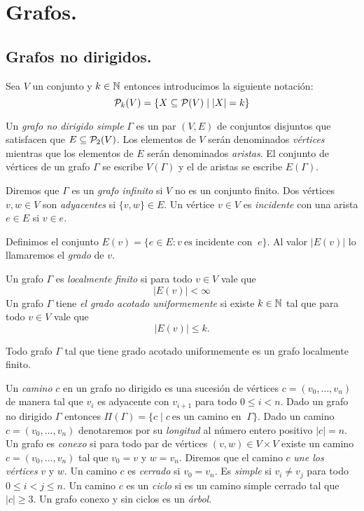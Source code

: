 \documentclass[tesis.tex]{subfiles}
\begin{document}
\section{Grafos.}

\subsection{Grafos no dirigidos.}\label{secc_graf_nd}

Sea $V$ un conjunto y $k \in \mathbb{N}$ entonces introducimos la siguiente notación:
\[
	{\cal P}_k(V) = \{ X \subseteq {\cal P}(V) \mid |X| = k   \}
\]

\begin{deff}
	Un \emph{grafo no dirigido simple} $\Gamma$ es un par $(V,E)$ de conjuntos disjuntos que satisfacen que
	$E \subseteq {\cal P}_{2}(V)$.
	Los elementos de $V$ serán denominados \emph{vértices} mientras que los elementos de $E$ serán denominados \emph{aristas}.
	El conjunto de vértices de un grafo $\Gamma$ se escribe $V(\Gamma)$ y el de aristas se escribe $E(\Gamma)$.
\end{deff}


Diremos que $\Gamma$ es un \emph{grafo infinito} si $V$ no es un conjunto finito.
Dos vértices $v,w \in V$ son \emph{adyacentes} si $\{v,w \} \in E$.
Un vértice $v \in V$ es \emph{incidente} con una arista $e \in E$ si $v \in e$.

Definimos el conjunto $E(v) = \{  e \in E : v \ \text{es incidente con } \ e \}$.
Al valor $|E(v)|$ lo llamaremos el \emph{grado} de $v$.


\begin{deff}
	Un grafo $\Gamma$ es \emph{localmente finito} si para todo $v \in V$ vale que
	\[
		| E(v) | < \infty
	\]
	Un grafo $\Gamma$ tiene \emph{el grado acotado uniformemente} si existe $k \in \mathbb{N}$ tal que para todo $v \in V$ vale que 
	\[
		|E(v)| \le k.
	\]
\end{deff}
\begin{obs}
	Todo grafo $\Gamma$ tal que tiene grado acotado uniformemente es un grafo localmente finito.
\end{obs}

Un \emph{camino} $c$ en un grafo no dirigido es una sucesión de vértices $c=(v_{0}, \dots, v_{n})$ de manera tal que $v_{i}$ es adyacente con $v_{i+1}$ para todo $0 \le i < n$.
Dado un grafo no dirigido $\Gamma$ entonces $\Pi (\Gamma) = \{  c \mid c \ \text{es un camino en } \ \Gamma \}$.
Dado un camino $c = (v_{0}, \dots, v_{n})$ denotaremos por su \emph{longitud} al número entero positivo $|c|= n$.
Un grafo es \emph{conexo} si para todo par de vértices $(v,w) \in V \times V$ existe un camino $c = (v_{0}, \dots, v_{n})$ tal que $v_{0} = v$ y $w=v_{n}$.
Diremos que el camino $c$ \emph{une los vértices} $v$ y $w$.
Un camino $c$ es \emph{cerrado} si $v_{0} = v_{n}$.
Es \emph{simple} si $v_{i} \neq v_{j}$ para todo $0 \le i < j \le n$.
Un camino $c$ es un \emph{ciclo} si es un camino simple cerrado tal que $|c| \ge 3$.
Un grafo conexo y sin ciclos es un \emph{árbol}.
\end{document}
